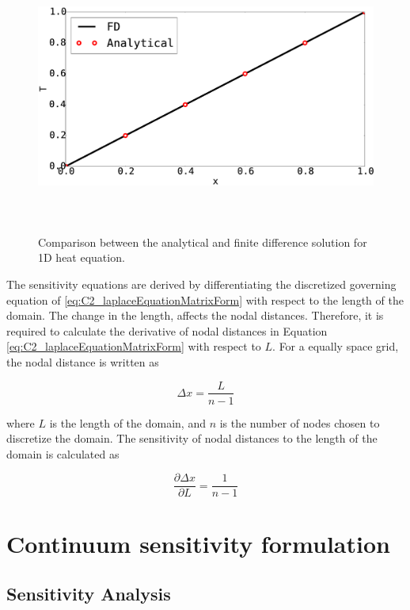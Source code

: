 \begin{figure}[h]
	\centering
	\includegraphics[height=9.00cm]{Chapter_2/figure/finitedifference_vs_analytical.eps}
	\caption{Comparison between the analytical and finite difference solution for 1D heat equation.}
	\label{fig:C2_verificationOfSolver}
\end{figure}

The sensitivity equations are derived by differentiating the discretized governing equation of \eqref{eq:C2_laplaceEquationMatrixForm} with respect to the length of the domain. The change in the length, affects the nodal distances. Therefore, it is required to calculate the derivative of nodal distances in Equation \eqref{eq:C2_laplaceEquationMatrixForm} with respect to $L$. For a equally space grid, the nodal distance is written as


\begin{equation*}
	\Delta x = \frac{L}{n - 1}
\end{equation*}

where $L$ is the length of the domain, and $n$ is the number of nodes chosen to discretize the domain. The sensitivity of nodal distances to the length of the domain is calculated as

\begin{equation}\label{eq:C2_nodeDistanceSensitivity}
	\frac{\partial \Delta x}{\partial L} = \frac{1}{n-1}
\end{equation}
\section{Continuum sensitivity formulation}

\subsection{Sensitivity Analysis}
